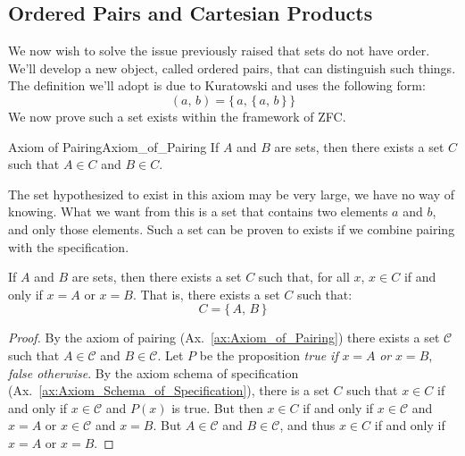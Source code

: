     \subsection{Ordered Pairs and Cartesian Products}
        We now wish to solve the issue previously raised that sets do
        not have order. We'll develop a new object, called ordered pairs, that
        can distinguish such things. The definition we'll adopt is due to
        Kuratowski and uses the following form:
        \begin{equation}
            (a,\,b)=\big\{\,a,\,\{\,a,\,b\,\}\,\big\}
        \end{equation}
        We now prove such a set exists within the framework of ZFC.
        \begin{faxiom}{Axiom of Pairing}{Axiom_of_Pairing}
            If $A$ and $B$ are sets, then there exists a set $C$ such that
            $A\in{C}$ and $B\in{C}$.
        \end{faxiom}
        The set hypothesized to exist in this axiom may be very large, we have
        no way of knowing. What we want from this is a set that contains two
        elements $a$ and $b$, and only those elements. Such a set can be proven
        to exists if we combine pairing with the specification.
        \begin{theorem}
            \label{thm:Existence_of_Set_Built_from_Two_Sets}%
            If $A$ and $B$ are sets, then there exists a set $C$ such that,
            for all $x$, $x\in{C}$ if and only if $x=A$ or $x=B$. That is,
            there exists a set $C$ such that:
            \begin{equation}
                C=\{\,A,\,B\,\}
            \end{equation}
        \end{theorem}
        \begin{proof}
            By the axiom of pairing (Ax.~\ref{ax:Axiom_of_Pairing}) there
            exists a set $\mathcal{C}$ such that $A\in\mathcal{C}$ and
            $B\in\mathcal{C}$. Let $P$ be the proposition
            \textit{true if} $x=A$ \textit{or} $x=B$, \textit{false otherwise}.
            By the axiom schema of specification
            (Ax.~\ref{ax:Axiom_Schema_of_Specification}), there is a set
            $C$ such that $x\in{C}$ if and only if $x\in\mathcal{C}$ and
            $P(x)$ is true. But then $x\in{C}$ if and only if
            $x\in\mathcal{C}$ and $x=A$ or $x\in\mathcal{C}$ and $x=B$.
            But $A\in\mathcal{C}$ and $B\in\mathcal{C}$, and thus
            $x\in{C}$ if and only if $x=A$ or $x=B$.
        \end{proof}
